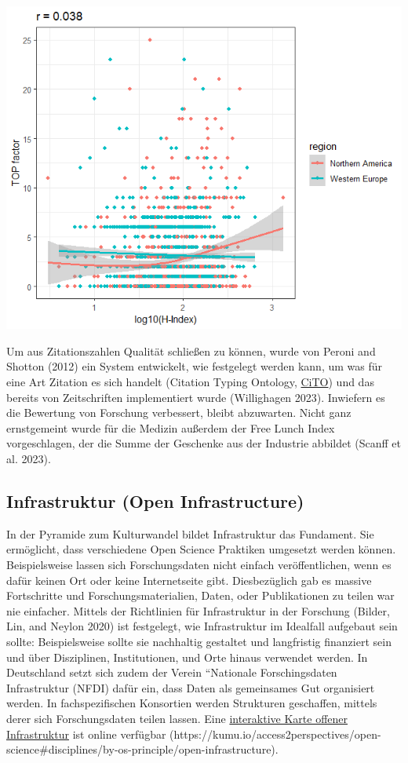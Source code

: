 \documentclass[
  letterpaper,
  DIV=11,
  numbers=noendperiod]{scrreprt}
\begin{document}
\begin{tcolorbox}
\includegraphics{images/tophindex.png}

\end{tcolorbox}

Um aus Zitationszahlen Qualität schließen zu können, wurde von Peroni
and Shotton (2012) ein System entwickelt, wie festgelegt werden kann, um
was für eine Art Zitation es sich handelt (Citation Typing Ontology,
\href{https://sparontologies.github.io/cito/current/cito.html}{CiTO})
und das bereits von Zeitschriften implementiert wurde (Willighagen
2023). Inwiefern es die Bewertung von Forschung verbessert, bleibt
abzuwarten. Nicht ganz ernstgemeint wurde für die Medizin außerdem der
Free Lunch Index vorgeschlagen, der die Summe der Geschenke aus der
Industrie abbildet (Scanff et al. 2023).

\subsection{Infrastruktur (Open
Infrastructure)}\label{infrastruktur-open-infrastructure}

In der Pyramide zum Kulturwandel bildet Infrastruktur das Fundament. Sie
ermöglicht, dass verschiedene Open Science Praktiken umgesetzt werden
können. Beispielsweise lassen sich Forschungsdaten nicht einfach
veröffentlichen, wenn es dafür keinen Ort oder keine Internetseite gibt.
Diesbezüglich gab es massive Fortschritte und Forschungsmaterialien,
Daten, oder Publikationen zu teilen war nie einfacher. Mittels der
Richtlinien für Infrastruktur in der Forschung (Bilder, Lin, and Neylon
2020) ist festgelegt, wie Infrastruktur im Idealfall aufgebaut sein
sollte: Beispielsweise sollte sie nachhaltig gestaltet und langfristig
finanziert sein und über Disziplinen, Institutionen, und Orte hinaus
verwendet werden. In Deutschland setzt sich zudem der Verein ``Nationale
Forschingsdaten Infrastruktur (NFDI) dafür ein, dass Daten als
gemeinsames Gut organisiert werden. In fachspezifischen Konsortien
werden Strukturen geschaffen, mittels derer sich Forschungsdaten teilen
lassen. Eine
\href{https://access2perspectives.org/mapping-open-science-resources/}{interaktive
Karte offener Infrastruktur} ist online verfügbar
(https://kumu.io/access2perspectives/open-science\#disciplines/by-os-principle/open-infrastructure).
\end{document}
